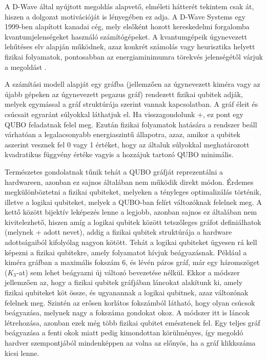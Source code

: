 A D-Wave által nyújtott megoldás alapvető, elméleti hátterét tekintem csak át, hiszen a dolgozat motivációját is lényegében ez adja. A D-Wave Systems egy 1999-ben alapított kanadai cég, mely elsőként hozott kereskedelmi forgalomba kvantumjelenségeket használó számítógépeket. A kvantumgépeik úgynevezett lehűtéses elv alapján működnek, azaz konkrét számolás vagy heurisztika helyett fizikai folyamatok, pontosabban az energiaminimumra törekvés jelenségétől várjuk a megoldást \cite{Szabo}. 

A számítási modell alapját egy gráfba (jellemzően az úgynevezett kiméra vagy az újabb gépeken az úgynevezett pegazus gráf) rendezett fizikai qubitek adják, melyek  egymással a gráf struktúrája szerint vannak kapcsolatban. A gráf éleit és csúcsait egyaránt súlyokkal láthatjuk el. Ha visszagondolunk \az+, ez pont egy QUBO feladatnak felel meg. Ezután fizikai folyamatok hatására a rendszer beáll várhatóan a legalacsonyabb energiaszintű állapotra, azaz, amikor a qubitek aszerint vesznek fel 0 vagy 1 értéket, hogy az általuk súlyokkal meghatározott kvadratikus függvény értéke vagyis a hozzájuk tartozó QUBO minimális.

Természetes gondolatnak tűnik tehát a QUBO gráfját reprezentálni a hardwareen, azonban ez sajnos általában nem működik direkt módon.
Érdemes megkülönböztetni a fizikai qubiteket, melyeken a tényleges optimalizálás történik, illetve a logikai qubiteket, melyek a QUBO-ban felírt változóknak felelnek meg. A kettő között bijektív leképezés lenne a legjobb, azonban sajnos ez általában nem kivitelezhető, hiszen amíg a logikai qubitek között tetszőleges gráfot definiálhatok (melynek \az+ adott nevet), addig a fizikai qubitek struktúrája a hardware adottságaiból kifolyólag nagyon kötött. Tehát a logikai qubiteket ügyesen rá kell képezni a fizikai qubitekre, amely folyamatot hívjuk beágyazásnak.
Például a kiméra gráfban a maximális fokszám 6, és lévén páros gráf, már egy háromszöget ($K_3$-at) sem lehet beágyazni új változó bevezetése nélkül. Ekkor a módszer jellemzően az, hogy a fizikai qubitek gráfjában láncokat alakítunk ki, amely fizikai qubiteket köt össze, és ugyanannak a logikai qubitnek, azaz változónak felelnek meg. Szintén az erősen korlátos fokszámból látható, hogy olyan csúcsok beágyazása, melynek nagy a fokszáma gondokat okoz. A módszer itt is láncok létrehozása, azonban ezek még több fizikai qubitet emésztenek fel. Egy teljes gráf beágyazása a fenti okok miatt pedig kimondottan körülményes, így megoldó hardver szempontjából mindenképpen az volna az előnyös, ha a gráf klikkszáma kicsi lenne.

